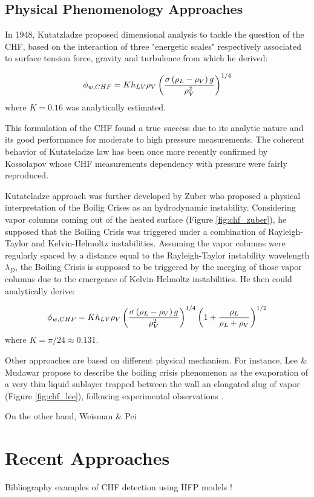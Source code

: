 \subsection{Physical Phenomenology Approaches}


In 1948, Kutatzladze \cite{kutateladze} proposed dimensional analysis to tackle the question of the CHF, based on the interaction of three "energetic scales" respectively associated to surface tension force, gravity and turbulence from which he derived:

\begin{equation}
\phi_{w,CHF} = K h_{LV} \rho_{V} \left( \frac{\sigma \left( \rho_{L} - \rho_{V} \right)g}{\rho_{V}^{2}} \right)^{1/4}
\label{eq:chf_kutateladze}
\end{equation} 
where $K=0.16$ was analytically estimated.

\npar

This formulation of the CHF found a true success due to its analytic nature and its good performance for moderate to high pressure measurements. The coherent behavior of Kutateladze law has been once more recently confirmed by Kossolapov \cite{kossolapov_experimental_2021} whose CHF measurements dependency with pressure were fairly reproduced.

\npar

Kutateladze approach was further developed by Zuber \cite{zuber_1958} who proposed a physical interpretation of the  Boilig Crises as an hydrodynamic instability. Considering vapor columns coming out of the heated surface (Figure \ref{fig:chf_zuber}), he supposed that the Boiling Crisis was triggered under a combination of Rayleigh-Taylor and Kelvin-Helmoltz instabilities. Assuming the vapor columns were regularly spaced by a distance equal to the Rayleigh-Taylor instability wavelength $\lambda_{D}$, the Boiling Crisis is supposed to be triggered by the merging of those vapor columns due to the emergence of Kelvin-Helmoltz instabilities. He then could analytically derive:

\begin{equation}
\phi_{w,CHF} = K h_{LV} \rho_{V} \left( \frac{\sigma \left( \rho_{L} - \rho_{V} \right)g}{\rho_{V}^{2}} \right)^{1/4} \left( 1 + \dfrac{\rho_{L}}{\rho_{L}+\rho_{V}} \right)^{1/2}
\label{eq:chf_zuber}
\end{equation} 
where $K=\pi / 24 \approx 0.131$.

\npar


Other approaches are based on different physical mechanism. For instance, Lee \& Mudawar \cite{lee_mudawar} propose to describe the boiling crisis phenomenon as the evaporation of a very thin liquid sublayer trapped between the wall an elongated slug of vapor (Figure \ref{fig:chf_lee}), following experimental observations \cite{Mesler (1976), Molen  Galjee (1978), Bhat et al. (1983), Serizawa
(1983), Hino  Ueda (1985) and Mudawwar et al. (1987)}.

\npar

On the other hand, Weisman \& Pei \cite{weisman_pei} 



\section{Recent Approaches}


Bibliography examples of CHF detection using HFP models !